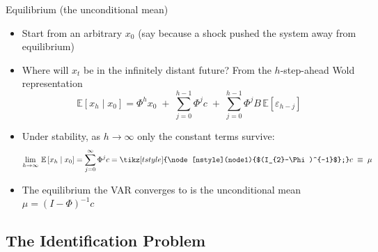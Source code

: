 \documentclass[10pt,handout]{beamer}
\DeclareRobustCommand{\hand}{%
\fontfamily{augie}\fontseries{m}\fontshape{n}\selectfont}
\begin{document}
\begin{frame}
{Equilibrium (the unconditional mean)}
\begin{itemize}
\item Start from an arbitrary $x_0$ (say because a shock pushed the system away from equilibrium) \bigskip
\item Where will $x_t$ be in the infinitely distant future? From the $h$-step-ahead Wold representation
\begin{equation*}
\mathbb{E}\left[x_{h}\mid x_0\right]
=\Phi^{h}x_{0}
\;+\;\sum_{j=0}^{h-1}\Phi^{j}c
\;+\;\sum_{j=0}^{h-1}\Phi^{j}B\,\mathbb{E}[\varepsilon_{h-j}]
\end{equation*}\pause
\item Under stability, as $h\to\infty$ only the constant terms survive:\medskip
\begin{equation*}
\lim_{h\to\infty}\,\mathbb{E}\left[x_{h}\mid x_0\right]
=\sum_{j=0}^{\infty}\Phi^{j}c
={\tikz[tstyle]{\node[nstyle](node1){$(I_{2}-\Phi)^{-1}$};}}c
\;\equiv\;\mu
\end{equation*}
\pause
\item The equilibrium the VAR converges to is the unconditional mean $\mu=(I-\Phi)^{-1}c$ 
\end{itemize}
\end{frame}


\subsection{The Identification Problem}

\begin{frame}
\color{title}  \par\bigskip 
\color{note} 
\end{frame}
\end{document}
